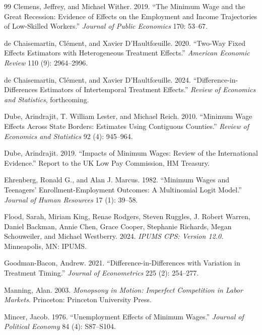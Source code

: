 \documentclass[12pt]{article}
\begin{document}
\begin{thebibliography}{99}
 Clemens, Jeffrey, and Michael Wither. 2019. ``The Minimum Wage and the Great Recession: Evidence of Effects on the Employment and Income Trajectories of Low-Skilled Workers.'' \textit{Journal of Public Economics} 170: 53--67.

 de Chaisemartin, Cl\'ement, and Xavier D'Haultf{\oe}uille. 2020. ``Two-Way Fixed Effects Estimators with Heterogeneous Treatment Effects.'' \textit{American Economic Review} 110 (9): 2964--2996.

 de Chaisemartin, Cl\'ement, and Xavier D'Haultf{\oe}uille. 2024. ``Difference-in-Differences Estimators of Intertemporal Treatment Effects.'' \textit{Review of Economics and Statistics}, forthcoming.

 Dube, Arindrajit, T. William Lester, and Michael Reich. 2010. ``Minimum Wage Effects Across State Borders: Estimates Using Contiguous Counties.'' \textit{Review of Economics and Statistics} 92 (4): 945--964.

 Dube, Arindrajit. 2019. ``Impacts of Minimum Wages: Review of the International Evidence.'' Report to the UK Low Pay Commission, HM Treasury.

 Ehrenberg, Ronald G., and Alan J. Marcus. 1982. ``Minimum Wages and Teenagers' Enrollment-Employment Outcomes: A Multinomial Logit Model.'' \textit{Journal of Human Resources} 17 (1): 39--58.

 Flood, Sarah, Miriam King, Renae Rodgers, Steven Ruggles, J. Robert Warren, Daniel Backman, Annie Chen, Grace Cooper, Stephanie Richards, Megan Schouweiler, and Michael Westberry. 2024. \textit{IPUMS CPS: Version 12.0}. Minneapolis, MN: IPUMS.

 Goodman-Bacon, Andrew. 2021. ``Difference-in-Differences with Variation in Treatment Timing.'' \textit{Journal of Econometrics} 225 (2): 254--277.

 Manning, Alan. 2003. \textit{Monopsony in Motion: Imperfect Competition in Labor Markets}. Princeton: Princeton University Press.

 Mincer, Jacob. 1976. ``Unemployment Effects of Minimum Wages.'' \textit{Journal of Political Economy} 84 (4): S87--S104.


\end{thebibliography}
\end{document}
